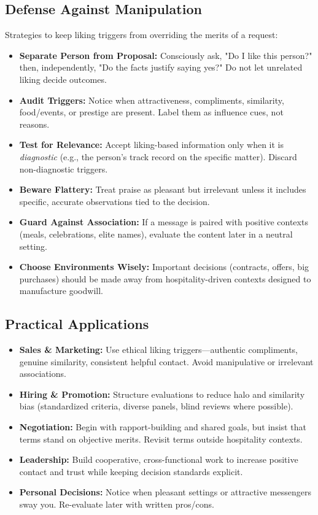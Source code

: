 \subsection*{Defense Against Manipulation}
Strategies to keep liking triggers from overriding the merits of a request:
\begin{itemize}
    \item \textbf{Separate Person from Proposal:} Consciously ask, "Do I like this person?" then, independently, "Do the facts justify saying yes?" Do not let unrelated liking decide outcomes.
    \item \textbf{Audit Triggers:} Notice when attractiveness, compliments, similarity, food/events, or prestige are present. Label them as influence cues, not reasons.
    \item \textbf{Test for Relevance:} Accept liking-based information only when it is \emph{diagnostic} (e.g., the person's track record on the specific matter). Discard non-diagnostic triggers.
    \item \textbf{Beware Flattery:} Treat praise as pleasant but irrelevant unless it includes specific, accurate observations tied to the decision.
    \item \textbf{Guard Against Association:} If a message is paired with positive contexts (meals, celebrations, elite names), evaluate the content later in a neutral setting.
    \item \textbf{Choose Environments Wisely:} Important decisions (contracts, offers, big purchases) should be made away from hospitality-driven contexts designed to manufacture goodwill.
\end{itemize}

\subsection*{Practical Applications}
\begin{itemize}
    \item \textbf{Sales \& Marketing:} Use ethical liking triggers—authentic compliments, genuine similarity, consistent helpful contact. Avoid manipulative or irrelevant associations.
    \item \textbf{Hiring \& Promotion:} Structure evaluations to reduce halo and similarity bias (standardized criteria, diverse panels, blind reviews where possible).
    \item \textbf{Negotiation:} Begin with rapport-building and shared goals, but insist that terms stand on objective merits. Revisit terms outside hospitality contexts.
    \item \textbf{Leadership:} Build cooperative, cross-functional work to increase positive contact and trust while keeping decision standards explicit.
    \item \textbf{Personal Decisions:} Notice when pleasant settings or attractive messengers sway you. Re-evaluate later with written pros/cons.
\end{itemize}
